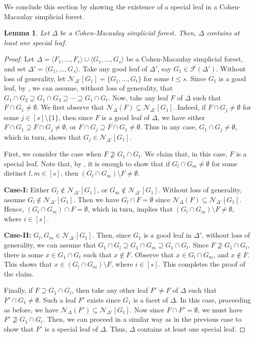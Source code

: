 \documentclass[12pt,a4paper,reqno]{amsart}
\newtheorem{lemma}[proposition]{Lemma}
\theoremstyle{definition}
\def\D{\Delta}
\def\F{\mathcal{F}}
\def\N{\mathcal{N}}
\def\l{\langle}
\def\r{\rangle}
\begin{document}
We conclude this section by showing the existence of a special leaf in a Cohen-Macaulay simplicial forest.

\begin{lemma}\label{special leaf existence}
    Let $\Delta$ be a Cohen-Macaulay simplicial forest. Then, $\Delta$ contains at least one special leaf.
\end{lemma}

\begin{proof}
    Let $\Delta=\l F_1,\ldots,F_r\r\cup\l G_1,\ldots,G_s\r$ be a Cohen-Macaulay simplicial forest, and set $\D'=\l G_1,\ldots,G_s\r$. Take any good leaf of $\D'$, say $G_1\in \F(\D')$. Without loss of generality, let $\N_{\D'}[G_1]=\{G_1,\ldots , G_t\}$ for some $t\leq s$. Since $G_1$ is a good leaf, by , we can assume, without loss of generality, that $G_1\cap G_2\supseteq G_1\cap G_3\supseteq \cdots \supseteq G_1\cap G_t$. Now, take any leaf $F$ of $\D$ such that $F\cap G_1\neq \emptyset$. We first observe that $\N_{\D}(F)\subseteq \N_{\D'}[G_1]$. Indeed, if $F\cap G_j\neq \emptyset$ for some $j\in [s]\setminus\{1\}$, then since $F$ is a good leaf of $\D$, we have either $F\cap G_1\supseteq F\cap G_j\neq \emptyset$, or $F\cap G_j\supseteq F\cap G_1\neq \emptyset$. Thus in any case, $G_1\cap G_j\neq \emptyset$, which in turn, shows that $G_j\in \N_{\D'}[G_1]$.
    
    First, we consider the case when $F\nsupseteq G_1\cap G_t$. We claim that, in this case, $F$ is a special leaf. Note that, by , it is enough to show that if $G_l\cap G_m\neq \emptyset$ for some distinct $l,m\in [s]$, then $(G_l\cap G_m)\setminus F\neq \emptyset$. 
    
    \noindent \textbf{Case-I:} Either $G_l\notin \N_{\D'}[G_1]$, or $G_m\notin \N_{\D'}[G_1]$. Without loss of generality, assume $G_l\notin \N_{\D'}[G_1]$. Then we have $G_l\cap F=\emptyset$ since $\N_{\D}(F)\subseteq \N_{\D'}[G_1]$. Hence, $(G_l\cap G_m)\cap F=\emptyset$, which in turn, implies that $(G_l\cap G_m)\setminus F\neq \emptyset$, where $i\in [s]$.
    
     \noindent \textbf{Case-II:} $G_l,G_m\in \N_{\D'}[G_1]$. Then, since $G_1$ is a good leaf in $\D'$, without loss of generality, we can assume that $G_1\cap G_l\supseteq G_1\cap G_m\supseteq G_1\cap G_t$. Since $F\nsupseteq G_1\cap G_t$, there is some $x\in G_1\cap G_t$ such that $x\notin F$. Observe that $x\in G_l\cap G_m$, and $x\notin F$. This shows that $x\in (G_l\cap G_m)\setminus F$, where $i\in [s]$. This completes the proof of the claim.

     \noindent
     Finally, if $F\supseteq G_1\cap G_t$, then take any other leaf $F'\neq F$ of $\D$ such that $F'\cap G_1\neq \emptyset$. Such a leaf $F'$ exists since $G_1$ is a facet of $\D$. In this case, proceeding as before, we have $\N_{\D}(F')\subseteq \N_{\D'}[G_1]$. Now since $F\cap F'=\emptyset$, we must have $F'\nsupseteq G_1\cap G_t$. Then, we can proceed in a similar way as in the previous case to show that $F'$ is a special leaf of $\D$. Thus, $\D$ contains at least one special leaf.
\end{proof}
\end{document}
